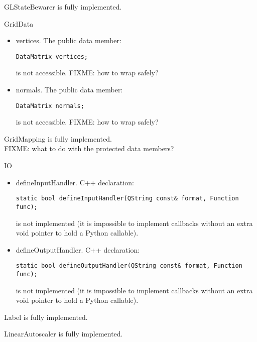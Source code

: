 \documentclass{manual}
\begin{document}
\begin{classdesc*}{GLStateBewarer}
  is fully implemented.
\end{classdesc*}

\begin{classdesc*}{GridData}
  \begin{itemize}
  \item{vertices}. The public data member:
\begin{verbatim}
DataMatrix vertices;
\end{verbatim}
    is not accessible. FIXME: how to wrap  safely?
  \item{normals}. The public data member:
\begin{verbatim}
DataMatrix normals;
\end{verbatim}
    is not accessible. FIXME: how to wrap  safely?
  \end{itemize}
\end{classdesc*}

\begin{classdesc*}{GridMapping}
  is fully implemented.\\
  FIXME: what to do with the protected data members?
\end{classdesc*}

\begin{classdesc*}{IO}
  \begin{itemize}
  \item{defineInputHandler}. C++ declaration:
\begin{verbatim}
static bool defineInputHandler(QString const& format, Function func);
\end{verbatim}
    is not implemented (it is impossible to implement callbacks without an
    extra void pointer to hold a Python callable).
  \item{defineOutputHandler}. C++ declaration:
\begin{verbatim}
static bool defineOutputHandler(QString const& format, Function func);
\end{verbatim}
    is not implemented (it is impossible to implement callbacks without an
    extra void pointer to hold a Python callable).
  \end{itemize}
\end{classdesc*}

\begin{classdesc*}{Label}
  is fully implemented.
\end{classdesc*}

\begin{classdesc*}{LinearAutoscaler}
  is fully implemented.
\end{classdesc*}
\end{document}
